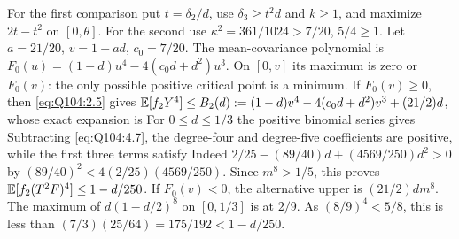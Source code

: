 For the first comparison put $t=\allowbreak \delta_2/d$, use $\delta_3\ge\allowbreak  t^2d$
and $k\ge\allowbreak 1$, and maximize $2t-t^2$ on $[0,\allowbreak \theta]$.
For the second use $\kappa^2=\allowbreak 361/1024>\allowbreak 7/20$, $5/4\ge\allowbreak 1$.
Let $a=\allowbreak 21/20$, $v=\allowbreak 1-ad$, $c_0=\allowbreak 7/20$.
The mean-covariance polynomial is
$F_0(u)=\allowbreak (1-d)u^4-4(c_0d+d^2)u^3$.
On $[0,\allowbreak v]$ its maximum is zero or $F_0(v)$: the only possible positive
critical point is a minimum.
If $F_0(v)\ge\allowbreak 0$, then \eqref{eq:Q104:2.5} gives
$\mathbb E[f_2Y^4]\le\allowbreak  B_2(d):=\allowbreak (1-d)v^4-4(c_0d+d^2)v^3+(21/2)d$,
whose exact expansion is
For $0\le\allowbreak  d\le\allowbreak 1/3$ the positive binomial series gives
Subtracting \eqref{eq:Q104:4.7}, the degree-four and degree-five
coefficients are positive, while the first three terms satisfy
Indeed $2/25-(89/40)d+(4569/250)d^2>\allowbreak 0$ by
$(89/40)^2<\allowbreak 4(2/25)(4569/250)$.
Since $m^8>\allowbreak 1/5$, this proves
$\mathbb E[f_2(T^2F)^4]\le\allowbreak 1-d/250$.
If $F_0(v)<\allowbreak 0$, the alternative upper is $(21/2)dm^8$.
The maximum of $d(1-d/2)^8$ on $[0,\allowbreak 1/3]$ is at $2/9$.
As $(8/9)^4<\allowbreak 5/8$, this is less than
$(7/3)(25/64)=\allowbreak 175/192<\allowbreak 1-d/250$.

